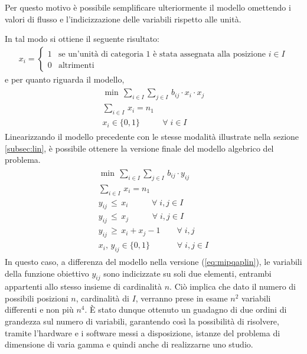 Per questo motivo è possibile semplificare ulteriormente il modello omettendo i valori di flusso e l'indicizzazione delle variabili 
rispetto alle unità. 

\newpage \noindent
In tal modo si ottiene il seguente risultato:
\begin{align*}
    x_{i} = \begin{cases}  1 & \mbox{se un'unità di categoria 1} \mbox{ è stata assegnata alla posizione } i \in I\\ 0 & \mbox{altrimenti} \end{cases}
\end{align*}
e per quanto riguarda il modello,
\begin{align*}
	\begin{array}{l}
      \min \, \sum_{i\in I} \sum_{j\in I} \, b_{ij}\cdot x_{i}\cdot x_{j} \\
      \sum_{i\in I} \, x_{i} = n_1 \\
      x_{i} \in \{0,1\}           \;\;\,\qquad \forall \; i \in I
    \end{array}
\end{align*}
Linearizzando il modello precedente con le stesse modalità illustrate nella sezione \ref{subsec:lin}, è possibile ottenere la versione 
finale del modello algebrico del problema.
\begin{align}
    \label{eq:mipqapfinal}
	\begin{array}{l}
      \min \, \sum_{i\in I} \sum_{j\in I} \, b_{ij}\cdot y_{ij} \\
      \sum_{i\in I} \, x_{i} = n_1 \\
      y_{ij} \, \leq \, x_{i}   \;\;\;\qquad \forall \; i,j \in I \\ 
      y_{ij} \, \leq \, x_{j}   \;\;\;\qquad \forall \; i,j \in I \\
      y_{ij} \, \geq \, x_{i} + x_{j} - 1      \qquad \forall \; i,j \\
      x_{i} ,\, y_{ij} \in \{0,1\}      \;\quad\qquad \forall \; i,j \in I
    \end{array}
\end{align}
In questo caso, a differenza del modello nella versione (\ref{eq:mipqaplin}), le variabili della funzione obiettivo $y_{ij}$ sono 
indicizzate su soli due elementi, entrambi appartenti allo stesso insieme di cardinalità $n$. Ciò implica che dato il numero di possibili posizioni $n$, 
cardinalità di $I$, verranno  prese in esame $n^2$ variabili differenti e non più $n^4$. È stato dunque ottenuto un guadagno di due ordini di grandezza sul numero 
di variabili, garantendo così la possibilità di risolvere, tramite l'hardware e i software messi a disposizione, istanze del problema di dimensione di varia gamma
e quindi anche di realizzarne uno studio.


